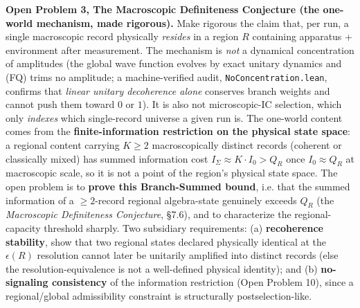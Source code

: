 \documentclass[11pt,a4paper]{article}
\begin{document}
\textbf{Open Problem 3, The Macroscopic Definiteness Conjecture (the one-world mechanism, made rigorous).}
Make rigorous the claim that, per run, a single macroscopic record physically \emph{resides} in a region $R$ containing apparatus + environment after measurement. The mechanism is \emph{not} a dynamical concentration of amplitudes (the global wave function evolves by exact unitary dynamics and (FQ) trims no amplitude; a machine-verified audit, \texttt{NoConcentration.lean}, confirms that \emph{linear unitary decoherence alone} conserves branch weights and cannot push them toward $0$ or $1$). It is also not microscopic-IC selection, which only \emph{indexes} which single-record universe a given run is. The one-world content comes from the \textbf{finite-information restriction on the physical state space}: a regional content carrying $K \ge 2$ macroscopically distinct records (coherent or classically mixed) has summed information cost $I_\Sigma \approx K \cdot I_0 > Q_R$ once $I_0 \approx Q_R$ at macroscopic scale, so it is not a point of the region's physical state space. The open problem is to \textbf{prove this Branch-Summed bound}, i.e. that the summed information of a $\ge 2$-record regional algebra-state genuinely exceeds $Q_R$ (the \emph{Macroscopic Definiteness Conjecture}, §7.6), and to characterize the regional-capacity threshold sharply. Two subsidiary requirements: (a) \textbf{recoherence stability}, show that two regional states declared physically identical at the $\epsilon(R)$ resolution cannot later be unitarily amplified into distinct records (else the resolution-equivalence is not a well-defined physical identity); and (b) \textbf{no-signaling consistency} of the information restriction (Open Problem 10), since a regional/global admissibility constraint is structurally postselection-like.
\end{document}
